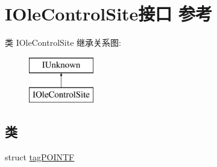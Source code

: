 \hypertarget{interface_i_ole_control_site}{}\section{I\+Ole\+Control\+Site接口 参考}
\label{interface_i_ole_control_site}
类 I\+Ole\+Control\+Site 继承关系图\+:\begin{figure}[H]
\begin{center}
\leavevmode
\includegraphics[height=2.000000cm]{interface_i_ole_control_site}
\end{center}
\end{figure}
\subsection*{类}
\begin{DoxyCompactItemize}
\item 
struct \hyperlink{struct_i_ole_control_site_1_1tag_p_o_i_n_t_f}{tag\+P\+O\+I\+N\+TF}
\end{DoxyCompactItemize}
